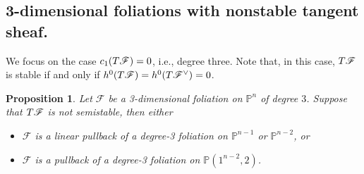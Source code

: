\documentclass[twoside]{amsart}
\numberwithin{equation}{section}
\newcommand{\p}[1]{{\mathbb{P}^{#1}}}
\newcommand{\pn}{{\mathbb{P}^{n}}}
\DeclareMathOperator{\rad}{rad}
\def\PP{{\mathbb{P}}}
\newcommand{\sF}{\mathscr{F}}
\newcommand{\tF}{{\rm T}\sF}
\newtheorem{proposition}[theorem]{Proposition}
\theoremstyle{definition}
\begin{document}



\subsection{3-dimensional foliations with nonstable tangent sheaf.}

 
We focus on the case $c_1(\tF) = 0$, i.e., degree three. Note that, in this case, $\tF$ is stable if and only if $h^0(\tF)= h^0(\tF^\vee) = 0$.  

\begin{proposition}
Let $\sF$ be a 3-dimensional foliation on $\pn$ of degree $3$. Suppose that $\tF$ is not semistable, then either
\begin{itemize}
    \item $\sF$ is a linear pullback of a degree-3 foliation on $\p{n-1}$ or $\p{n-2}$, or
    \item $\sF$ is a pullback of a degree-3 foliation on $\PP(1^{n-2},2)$.
\end{itemize}
\end{proposition}
\end{document}
